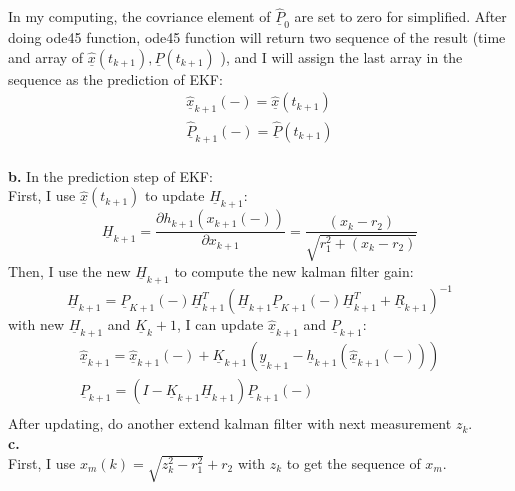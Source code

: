 \documentclass{article}
\begin{document}
In my computing, the covriance element of  $\underline{\hat{P}}_0$ are set to zero for simplified.
After doing ode45 function, ode45 function will return two sequence of the result (time and array of $\underline{\hat{x}}(t_{k+1}), \underline{P}(t_{k+1})$ ), and
I will assign the last array in the sequence as the prediction of EKF:
\begin{equation}
\begin{array}{l}
\underline{\hat{x}}_{k + 1} ( - ) = \underline{\hat{x}}(t_{k + 1} ) \\ 
 \underline{\hat{P}}_{k + 1} ( - ) = \underline{\hat{P}}(t_{k + 1} ) \\ 
 \end{array}
\end{equation}  

\noindent \textbf{b.}  In the prediction step of EKF:\\
First, I use $\underline{\hat{x}}(t_{k+1})$ to update $\underline{H}_{k+1}$:
\begin{equation}
	\underline{H}_{k + 1}  = \frac{{\partial h_{k + 1} (x_{k + 1} ( - ))}}{{\partial x_{k + 1} }} = \frac{{(x_k  - r_2 )}}{{\sqrt {r_1^2  + (x_k  - r_2 )} }}
\end{equation}
Then, I use the new $\underline{H}_{k+1}$ to compute the new kalman filter gain:
\begin{equation}
	\underline{H}_{k + 1}  = \underline{P}_{K + 1} ( - )\underline{H}_{k + 1}^T (\underline{H}_{k + 1} \underline{P}_{K + 1} ( - )\underline{H}_{k + 1}^T  + \underline{R}_{k + 1} )^{ - 1} 
\end{equation} 
with new $\underline{H}_{k+1}$ and $\underline{K}_k+1$, I can update $\underline{\hat{x}}_{k+1}$ and $\underline{P}_{k+1}$:
\begin{equation}
\begin{array}{l}
 \underline{\hat{x}}_{k + 1}  = \underline{\hat{x}}_{k + 1} ( - ) + \underline{K}_{k + 1} (\underline{y}_{k + 1}  - \underline{h}_{k + 1} (\underline{\hat{x}}_{k + 1} ( - ))) \\ 
 \underline{P}_{k + 1}  = (I - \underline{K}_{k + 1} \underline{H}_{k + 1} )\underline{P}_{k + 1} ( - ) \\ 
 \end{array}
\end{equation}
After updating, do another extend kalman filter with next measurement $z_k$.\\
\noindent \textbf{c.}\\
First, I use $x_m(k)=\sqrt{z_k^2-r_1^2}+r_2$ with $z_k$ to get the sequence of $x_m$.
\end{document}
